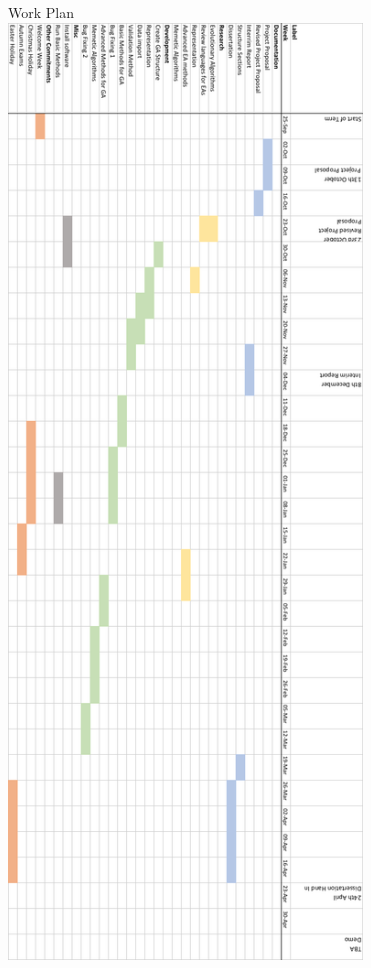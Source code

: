 \documentclass[a4paper]{article}
\begin{document}
\clearpage
\begin{center}
    \Large{Work Plan}\\
\includegraphics[height=24.8cm]{workPlanOLD.png}
\end{center}
\end{document}
